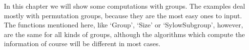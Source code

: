 


In this chapter we will show  some computations with groups. The examples
deal mostly with permutation groups, because they are the most easy ones
to input.  The functions mentioned here, like `Group', `Size' or
`SylowSubgroup', however, are the same for all  kinds of groups, although
the algorithms which compute the information  of course will be different
in most cases.


